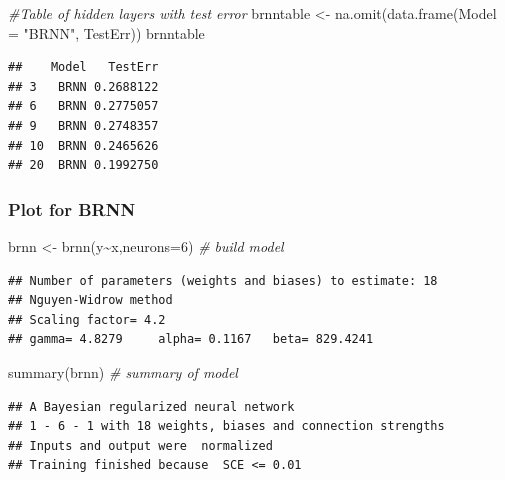 \documentclass[
]{article}
\newenvironment{Shaded}{\begin{snugshade}}{\end{snugshade}}
\newcommand{\AttributeTok}[1]{\textcolor[rgb]{0.77,0.63,0.00}{#1}}
\newcommand{\CommentTok}[1]{\textcolor[rgb]{0.56,0.35,0.01}{\textit{#1}}}
\newcommand{\DecValTok}[1]{\textcolor[rgb]{0.00,0.00,0.81}{#1}}
\newcommand{\FunctionTok}[1]{\textcolor[rgb]{0.00,0.00,0.00}{#1}}
\newcommand{\NormalTok}[1]{#1}
\newcommand{\OtherTok}[1]{\textcolor[rgb]{0.56,0.35,0.01}{#1}}
\newcommand{\SpecialCharTok}[1]{\textcolor[rgb]{0.00,0.00,0.00}{#1}}
\newcommand{\StringTok}[1]{\textcolor[rgb]{0.31,0.60,0.02}{#1}}
\begin{document}
\begin{Shaded}
\begin{Highlighting}[]
\CommentTok{\#Table of hidden layers with test error}
\NormalTok{brnntable }\OtherTok{\textless{}{-}} \FunctionTok{na.omit}\NormalTok{(}\FunctionTok{data.frame}\NormalTok{(}\AttributeTok{Model =} \StringTok{"BRNN"}\NormalTok{, TestErr))}
\NormalTok{brnntable}
\end{Highlighting}
\end{Shaded}

\begin{verbatim}
##    Model   TestErr
## 3   BRNN 0.2688122
## 6   BRNN 0.2775057
## 9   BRNN 0.2748357
## 10  BRNN 0.2465626
## 20  BRNN 0.1992750
\end{verbatim}

\hypertarget{plot-for-brnn}{%
\subsubsection{Plot for BRNN}\label{plot-for-brnn}}

\begin{Shaded}
\begin{Highlighting}[]
\NormalTok{brnn }\OtherTok{\textless{}{-}} \FunctionTok{brnn}\NormalTok{(y}\SpecialCharTok{\textasciitilde{}}\NormalTok{x,}\AttributeTok{neurons=}\DecValTok{6}\NormalTok{)   }\CommentTok{\# build model}
\end{Highlighting}
\end{Shaded}

\begin{verbatim}
## Number of parameters (weights and biases) to estimate: 18 
## Nguyen-Widrow method
## Scaling factor= 4.2 
## gamma= 4.8279     alpha= 0.1167   beta= 829.4241
\end{verbatim}

\begin{Shaded}
\begin{Highlighting}[]
\FunctionTok{summary}\NormalTok{(brnn)                 }\CommentTok{\# summary of model}
\end{Highlighting}
\end{Shaded}

\begin{verbatim}
## A Bayesian regularized neural network 
## 1 - 6 - 1 with 18 weights, biases and connection strengths
## Inputs and output were  normalized
## Training finished because  SCE <= 0.01
\end{verbatim}
\end{document}
